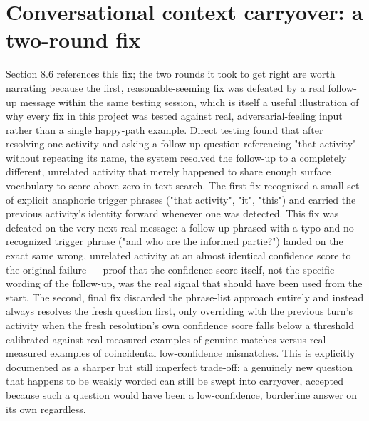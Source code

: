 \section{Conversational context carryover: a two-round fix}
Section 8.6 references this fix; the two rounds it took to get right are worth narrating because the first, reasonable-seeming fix was defeated by a real follow-up message within the same testing session, which is itself a useful illustration of why every fix in this project was tested against real, adversarial-feeling input rather than a single happy-path example. Direct testing found that after resolving one activity and asking a follow-up question referencing "that activity" without repeating its name, the system resolved the follow-up to a completely different, unrelated activity that merely happened to share enough surface vocabulary to score above zero in text search. The first fix recognized a small set of explicit anaphoric trigger phrases ("that activity", "it", "this") and carried the previous activity's identity forward whenever one was detected. This fix was defeated on the very next real message: a follow-up phrased with a typo and no recognized trigger phrase ("and who are the informed partie?") landed on the exact same wrong, unrelated activity at an almost identical confidence score to the original failure — proof that the confidence score itself, not the specific wording of the follow-up, was the real signal that should have been used from the start. The second, final fix discarded the phrase-list approach entirely and instead always resolves the fresh question first, only overriding with the previous turn's activity when the fresh resolution's own confidence score falls below a threshold calibrated against real measured examples of genuine matches versus real measured examples of coincidental low-confidence mismatches. This is explicitly documented as a sharper but still imperfect trade-off: a genuinely new question that happens to be weakly worded can still be swept into carryover, accepted because such a question would have been a low-confidence, borderline answer on its own regardless.

